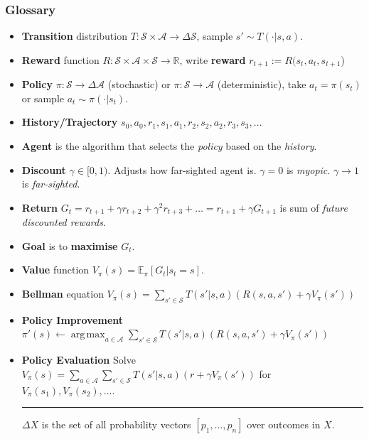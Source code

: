 \documentclass[10pt,a4paper]{beamer}
\renewcommand{\S}{\mathcal{S}}
\newcommand{\A}{\mathcal{A}}
\DeclareMathOperator*{\argmax}{arg\,max}
\begin{document}
\begin{frame}
	\small{
    \frametitle{Glossary}
    \begin{itemize}
        \item \textbf{Transition} distribution $T : \S \times \A \to \Delta \S$, sample $s' \sim T(\cdot | s,a)$.
        \item \textbf{Reward} function $R : \S \times \A \times \S \to \mathbb{R}$, write \textbf{reward} $r_{t+1} := R(s_t, a_t, s_{t+1}$)
        \item \textbf{Policy} $\pi : \S \to \Delta \A$ (stochastic) or $\pi : \S \to \A$ (deterministic), take $a_{t} = \pi(s_t)$ or sample $a_{t} \sim \pi(\cdot | s_t)$.
        \item \textbf{History/Trajectory}
        $
        s_0, a_0, r_1, s_1, a_1, r_2, s_2, a_2, r_3, s_3, \ldots
        $
        \item \textbf{Agent} is the algorithm that selects the \textit{policy} based on the \textit{history}.
        \item \textbf{Discount} $\gamma \in [0,1)$. Adjusts how far-sighted agent is. $\gamma = 0$ is \emph{myopic}. $\gamma \to 1$ is \emph{far-sighted}.
        \item \textbf{Return} $G_t = r_{t+1} + \gamma r_{t+2} + \gamma^2 r_{t+3} + \ldots = r_{t+1} + \gamma G_{t+1}$ is sum of \textit{future discounted rewards}.
        \item \textbf{Goal} is to \textbf{maximise} $G_t$.
        \item \textbf{Value} function $V_{\pi}(s) = \mathbb{E}_\pi [ G_t | s_t = s]$.
        \item \textbf{Bellman} equation 
        $
        V_\pi(s) = \sum_{s' \in \S} T(s' | s, a) \left( R(s,a,s') + \gamma V_\pi(s') \right) 
        $ 
		\item \textbf{Policy Improvement}
			$
			\pi'(s) \leftarrow \argmax_{a \in \A} \sum_{s' \in \S} T(s' | s,a) 
			\left( R(s,a,s') + \gamma V_{\pi}(s') \right)
			$
		\item \textbf{Policy Evaluation}
			Solve
			$
			V_\pi(s) = \sum_{a \in \A} \sum_{s' \in \S} T(s' | s, a) \left( r + \gamma V_\pi(s') \right) 
			$ for $V_\pi(s_1), V_\pi(s_2), \ldots$.
        
        \hspace{0pt}
        \rule{0.3\textwidth}{0.5pt}
        \vspace{0.1cm}
        
        
        \footnotesize{$\Delta X$ is the set of all probability vectors $[p_1, \ldots, p_n]$ over outcomes in $X$.}
    \end{itemize}
	}
\end{frame}
\end{document}
